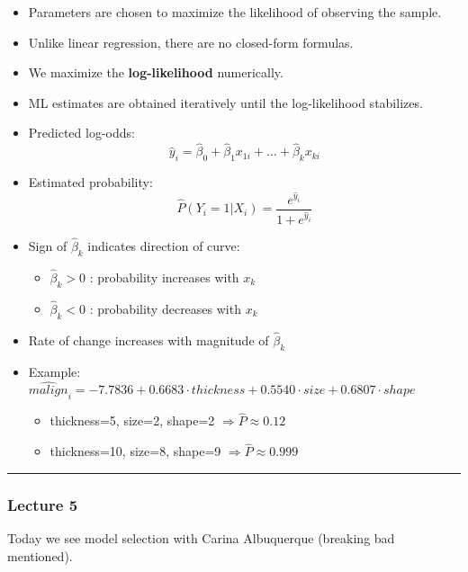 \begin{itemize}
    \item Parameters are chosen to maximize the likelihood of observing the sample.
    \item Unlike linear regression, there are no closed-form formulas.
    \item We maximize the \textbf{log-likelihood} numerically.
    \item ML estimates are obtained iteratively until the log-likelihood stabilizes.
    \item Predicted log-odds:
    \[
        \hat{y}_i = \hat{\beta}_0 + \hat{\beta}_1 x_{1i} + \dots + \hat{\beta}_k x_{ki}
    \]
    \item Estimated probability:
    \[
        \hat{P}(Y_i=1|X_i) = \frac{e^{\hat{y}_i}}{1+e^{\hat{y}_i}}
    \]
    \item Sign of \(\hat{\beta}_k\) indicates direction of curve:
    \begin{itemize}
        \item \(\hat{\beta}_k > 0\) : probability increases with \(x_k\)
        \item \(\hat{\beta}_k < 0\) : probability decreases with \(x_k\)
    \end{itemize}
    \item Rate of change increases with magnitude of \(\hat{\beta}_k\)
    \item Example: \(\hat{malign}_i = -7.7836 + 0.6683 \cdot thickness + 0.5540 \cdot size + 0.6807 \cdot shape\)
    \begin{itemize}
        \item thickness=5, size=2, shape=2 \(\Rightarrow \hat{P} \approx 0.12\)
        \item thickness=10, size=8, shape=9 \(\Rightarrow \hat{P} \approx 0.999\)
    \end{itemize}
\end{itemize}



\vspace{10pt}

\hrule

\vspace{10pt}

\subsubsection{Lecture 5}

Today we see model selection with Carina Albuquerque (breaking bad mentioned).

